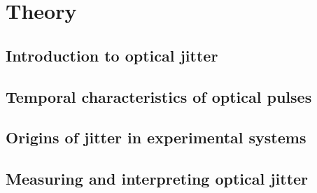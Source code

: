 \chapter{Theory}

\section{Introduction to optical jitter}
\section{Temporal characteristics of optical pulses}
\section{Origins of jitter in experimental systems}
\section{Measuring and interpreting optical jitter}